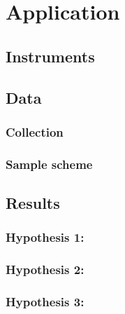 \chapter{Application} \label{chap:application}

\section{Instruments}



\section{Data}

\subsection{Collection}

\subsection{Sample scheme}



\section{Results}

\subsection{Hypothesis 1: }

\subsection{Hypothesis 2: }

\subsection{Hypothesis 3: }
